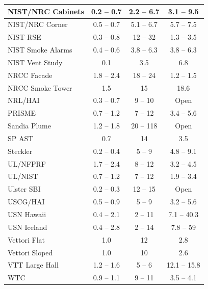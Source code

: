 \begin{table}[!t]
\begin{tabular}{|l|c|c|c|}
NIST/NRC Cabinets   & 0.2 -- 0.7    & 2.2 -- 6.7    & 3.1 -- 9.5    \\ \hline
NIST/NRC Corner     & 0.5 -- 0.7    & 5.1 -- 6.7    & 5.7 -- 7.5    \\ \hline
NIST RSE            & 0.3 -- 0.8    & 12 -- 32      & 1.3 -- 3.5    \\ \hline
NIST Smoke Alarms   & 0.4 -- 0.6    & 3.8 -- 6.3    & 3.8 -- 6.3    \\ \hline
NIST Vent Study     & 0.1           & 3.5           & 6.8           \\ \hline
NRCC Facade         & 1.8 -- 2.4    & 18 -- 24      & 1.2 -- 1.5    \\ \hline
NRCC Smoke Tower    & 1.5           & 15            & 18.6          \\ \hline
NRL/HAI             & 0.3 -- 0.7    & 9 -- 10       & Open          \\ \hline
PRISME              & 0.7 -- 1.2    & 7 -- 12       & 3.4 -- 5.6    \\ \hline
Sandia Plume        & 1.2 -- 1.8    & 20 -- 118     & Open          \\ \hline
SP AST              & 0.7           & 14            & 3.5           \\ \hline
Steckler            & 0.2 -- 0.4    & 5 -- 9        & 4.8 -- 9.1    \\ \hline
UL/NFPRF            & 1.7 -- 2.4    & 8 -- 12       & 3.2 -- 4.5    \\ \hline
UL/NIST             & 0.7 -- 1.2    & 7 -- 12       & 1.9 -- 3.4    \\ \hline
Ulster SBI          & 0.2 -- 0.3    & 12 -- 15      & Open          \\ \hline
USCG/HAI            & 0.5 -- 0.9    & 5 -- 9        & 3.2 -- 5.6    \\ \hline
USN Hawaii          & 0.4 -- 2.1    & 2 -- 11       & 7.1 -- 40.3   \\ \hline
USN Iceland         & 0.4 -- 2.8    & 2 -- 14       & 7.8 -- 59     \\ \hline
Vettori Flat        & 1.0           & 12            & 2.8           \\ \hline
Vettori Sloped      & 1.0           & 10            & 2.6           \\ \hline
VTT Large Hall      & 1.2 -- 1.6    & 5 -- 6        & 12.1 -- 15.8  \\ \hline
WTC                 & 0.9 -- 1.1    & 9 -- 11       & 3.5 -- 4.1    \\ \hline
\end{tabular}
\label{Numerical_Parameters}
\nopagebreak
\end{table}





